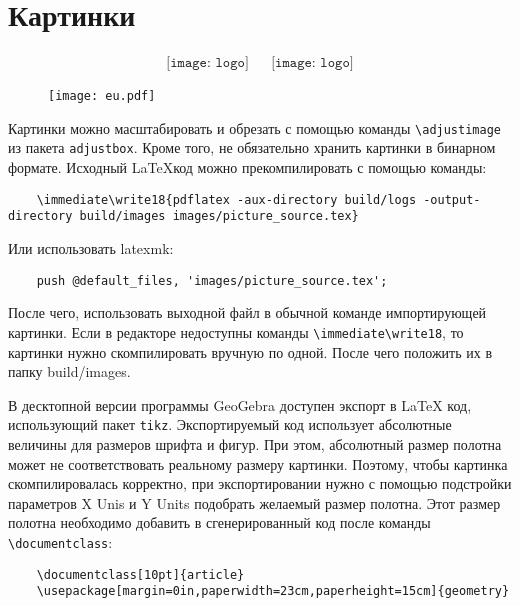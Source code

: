 \section{Картинки}

\begin{align*}
    \texttt{[image: logo]}
     &  &
    \texttt{[image: logo]}
\end{align*}
\begin{figure}[h]
    \texttt{[image: eu.pdf]}
\end{figure}
\begin{center}
\end{center}
Картинки можно масштабировать и обрезать с помощью команды \verb|\adjustimage| из пакета \verb|adjustbox|.
Кроме того, не обязательно хранить картинки в бинарном формате.
Исходный \LaTeX\:код можно прекомпилировать с помощью команды:
\begin{verbatim}
    \immediate\write18{pdflatex -aux-directory build/logs -output-directory build/images images/picture_source.tex}
\end{verbatim}
Или использовать latexmk:
\begin{verbatim}
    push @default_files, 'images/picture_source.tex';
\end{verbatim}

После чего, использовать выходной файл в обычной команде импортирующей картинки.
Если в редакторе недоступны команды \verb|\immediate\write18|, то картинки нужно скомпилировать вручную по одной.
После чего положить их в папку build/images.

В десктопной версии программы GeoGebra доступен экспорт в \LaTeX\: код, использующий пакет \verb|tikz|.
Экспортируемый код использует абсолютные величины для размеров шрифта и фигур.
При этом, абсолютный размер полотна может не соответствовать реальному размеру картинки.
Поэтому, чтобы картинка скомпилировалась корректно, при экспортировании нужно с помощью подстройки параметров X Unis и Y Units подобрать желаемый размер полотна.
Этот размер полотна необходимо добавить в сгенерированный код после команды \verb|\documentclass|:
\begin{verbatim}
    \documentclass[10pt]{article}
    \usepackage[margin=0in,paperwidth=23cm,paperheight=15cm]{geometry}
\end{verbatim}


